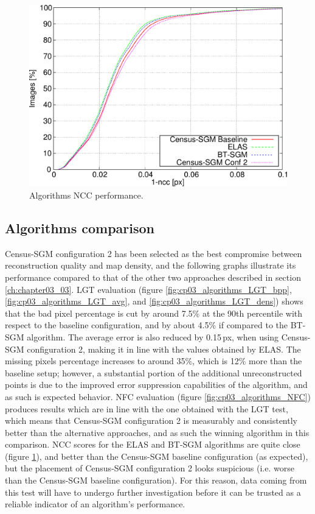 \begin{figure}[h!]
  \centering
  \includegraphics[width=\textwidth, height=0.5\textwidth, trim=0 0 0 0,clip]{algo_ncc}
  \caption{ Algorithms NCC performance.}
  \label{fig:cp03_algorithms_NCC}
\end{figure}%

\subsection{Algorithms comparison}\label{ch:chapter03_04_03}

Census-SGM configuration 2 has been selected as the best compromise between reconstruction quality and map density, and the following graphs illustrate its performance compared to that of the other two approaches described in section \ref{ch:chapter03_03}. LGT evaluation (figure \ref{fig:cp03_algorithms_LGT_bpp}, \ref{fig:cp03_algorithms_LGT_avg}, and \ref{fig:cp03_algorithms_LGT_dens}) shows that the bad pixel percentage is cut by around 7.5\% at the 90th percentile with respect to the baseline configuration, and by about 4.5\% if compared to the BT-SGM algorithm. The average error is also reduced by 0.15\,px, when using Census-SGM configuration 2, making it in line with the values obtained by ELAS. The missing pixels percentage increases to around 35\%, which is 12\% more than the baseline setup; however, a substantial portion of the additional unreconstructed points is due to the improved error suppression capabilities of the algorithm, and as such is expected behavior.
NFC evaluation (figure \ref{fig:cp03_algorithms_NFC}) produces results which are in line with the one obtained with the LGT test, which means that Census-SGM configuration 2 is measurably and consistently better than the alternative approaches, and as such the winning algorithm in this comparison.
NCC scores for the ELAS and BT-SGM algorithms are quite close (figure \ref{fig:cp03_algorithms_NCC}), and better than the Census-SGM baseline configuration (as expected), but the placement of Census-SGM configuration 2 looks suspicious (i.e. worse than the Census-SGM baseline configuration). For this reason, data coming from this test will have to undergo further investigation before it can be trusted as a reliable indicator of an algorithm's performance.

